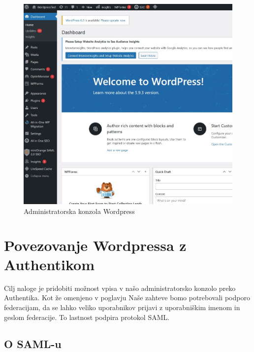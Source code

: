 \documentclass[a4paper,12pt,openright]{book}
\begin{document}
\begin{figure}[H]
\hspace{-2cm}
\includegraphics[scale=0.7]{diploma-FRI-vzorec_11maj2021/Screenshot_1.jpg}
\caption{Administratorska konzola Wordpress}
\label{fig:adminWord}
\end{figure}

\section{Povezovanje Wordpressa z Authentikom}

Cilj naloge je pridobiti možnost vpisa v našo administratorsko konzolo preko Authentika. Kot že omenjeno v poglavju Naše zahteve bomo potrebovali podporo federacijam, da se lahko veliko uporabnikov prijavi z uporabniškim imenom in geslom federacije. To lastnost podpira protokol SAML.

\subsection{O SAML-u}
\end{document}
